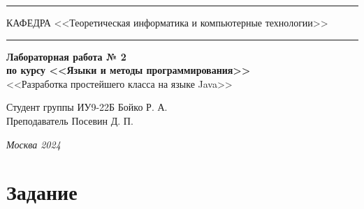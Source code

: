 \documentclass[a4paper, 14pt]{extarticle}
\begin{document}
\begin{titlepage}
    \vspace*{-16pt}
    \hspace{47pt}\rule{0.83\textwidth}{0.4pt}

    \vspace{0.5ex}
    \hspace{-35pt} \noindent \small КАФЕДРА\hspace{50pt} <<Теоретическая информатика и компьютерные технологии>>

    \vspace*{-16pt}
    \hspace{30pt}\rule{0.866\textwidth}{0.4pt}

    \vspace{11em}

    \begin{center}
        \Large {\bf Лабораторная работа № 2} \\
        \large {\bf по курсу <<Языки и методы программирования>>} \\
        \large <<Разработка простейшего класса на языке Java>>
    \end{center}\normalsize

    \vspace{8em}


    \begin{flushright}
        {Студент группы ИУ9-22Б Бойко Р. А. \hspace*{15pt}\\
            \vspace{2ex}
            Преподаватель Посевин Д. П.\hspace*{15pt}}
    \end{flushright}

    \bigskip

    \vfill


    \begin{center}
        \textsl{Москва 2024}
    \end{center}
\end{titlepage}

\renewcommand{\ttdefault}{pcr}

\setlength{\tabcolsep}{3pt}
\newpage
\setcounter{page}{2}

\section{Задание}\label{Sect::task}
\end{document}
